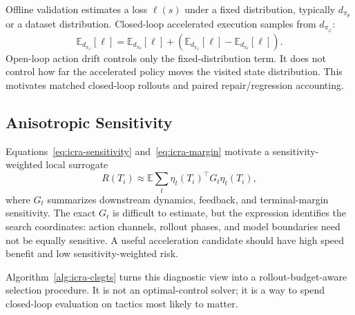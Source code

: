 \documentclass[letterpaper,10pt,twocolumn]{article}
\newcommand{\dpi}{d_{\pi_\theta}}
\newcommand{\da}{d_{\pi_\varphi}}
\begin{document}
Offline validation estimates a loss $\ell(s)$ under a fixed distribution, typically $d_{\pi_\theta}$ or a dataset distribution. Closed-loop accelerated execution samples from $d_{\pi_\varphi}$:
\begin{equation}
    \mathbb{E}_{\da}[\ell]
    =
    \mathbb{E}_{\dpi}[\ell]
    +
    \left(\mathbb{E}_{\da}[\ell]
    -
    \mathbb{E}_{\dpi}[\ell]\right).
    \label{eq:icra-distribution}
\end{equation}
Open-loop action drift controls only the fixed-distribution term. It does not control how far the accelerated policy moves the visited state distribution. This motivates matched closed-loop rollouts and paired repair/regression accounting.

\subsection{Anisotropic Sensitivity}

Equations~\eqref{eq:icra-sensitivity} and~\eqref{eq:icra-margin} motivate a sensitivity-weighted local surrogate
\begin{equation}
    R(T_i) \approx \mathbb{E}\sum_t \eta_t(T_i)^\top G_t\eta_t(T_i),
    \label{eq:icra-risk}
\end{equation}
where $G_t$ summarizes downstream dynamics, feedback, and terminal-margin sensitivity. The exact $G_t$ is difficult to estimate, but the expression identifies the search coordinates: action channels, rollout phases, and model boundaries need not be equally sensitive. A useful acceleration candidate should have high speed benefit and low sensitivity-weighted risk.

Algorithm~\ref{alg:icra-clsgts} turns this diagnostic view into a rollout-budget-aware selection procedure. It is not an optimal-control solver; it is a way to spend closed-loop evaluation on tactics most likely to matter.
\end{document}
